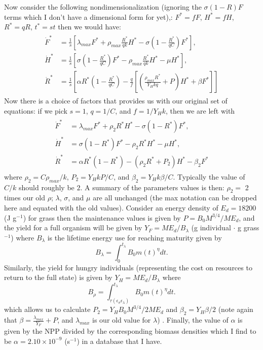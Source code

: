 \documentclass{pnastwo}
\begin{document}
\begin{article}
Now consider the following nondimensionalization (ignoring the $\sigma (1-R)F$ terms which I don't have a dimensional form for yet),: $F^{*}=fF$, $H^{*}=fH$, $R^{*}=qR$, $t^{*}=st$ then we would have:
\begin{align} 
\begin{split}
\dot{F}^{*} &= \frac{1}{s}\left[\lambda_{max} F^{*} + \rho_{max}\frac{R^{*}}{qk}H^{*} - \sigma \left(1-\frac{R^{*}}{qC}\right)F^{*}\right],  \\
\dot{H}^{*} &= \frac{1}{s}\left[\sigma \left(1-\frac{R^{*}}{qC}\right)F^{*} - \rho_{max}\frac{R^{*}}{qk} H^{*} - \mu H^{*}\right],  \\
\dot{R}^{*} &= \frac{1}{s}\left[\alpha R^{*}\left(1-\frac{R^{*}}{qC}\right) -\frac{q}{f}\left[\left(\frac{\rho_{max}R^{*}}{Y_{H}kq}+P\right)H^{*}+\beta F^{*}\right]\right]
\end{split}
\end{align}
Now there is a choice of factors that provides us with our original set of equations: if we pick $s=1$, $q=1/C$, and $f=1/Y_{H}k$, then we are left with 
\begin{align} 
\begin{split}
\dot{F}^{*} &= \lambda_{max} F^{*} + \rho_{2}R^{*}H^{*} - \sigma \left(1-R^{*}\right)F^{*},  \\
\dot{H}^{*} &= \sigma \left(1-R^{*}\right)F^{*} - \rho_{2} R^{*}H^{*} - \mu H^{*},  \\
\dot{R}^{*} &= \alpha R^{*}\left(1-R^{*}\right) -\left(\rho_{2}R^{*}+P_{2}\right)H^{*}-\beta_{2} F^{*}
\end{split}
\end{align}
where $\rho_{2}=C\rho_{max}/k$, $P_{2}=Y_{H}kP/C$, and $\beta_{2}=Y_{H}k\beta/C$. Typically the value of $C/k$ should roughly be $2$. A summary of the parameters values is then: $\rho_{2}=$ 2 times our old $\rho$; $\lambda$, $\sigma$, and $\mu$ are all unchanged (the max notation can be dropped here and equated with the old values). Consider an energy density of $E_{d}=18200$ (J g$^{-1}$) for grass \cite{estermann} then the maintenance values is given by $P=B_{0}M^{3/4}/ME_{d}$, and the yield for a full organism will be given by $Y_{F}=ME_{d}/B_{\lambda}$ (g individual $\cdot$ g grass $^{-1}$) where $B_{\lambda}$ is the lifetime energy use for reaching maturity given by 
\begin{equation}
B_{\lambda}=\int_{0}^{t_{\lambda}}B_{0}m\left(t\right)^{\eta}dt.
\end{equation}
Similarly, the yield for hungry individuals (representing the cost on resources to return to the full state) is given by $Y_{H}=ME_{d}/B_{\lambda}$ where
\begin{equation}
B_{\rho}=\int_{\tau\left(\epsilon_{\sigma}\epsilon_{\lambda}\right)}^{t_{\lambda}}B_{0}m\left(t\right)^{\eta}dt.
\end{equation}
which allows us to calculate $P_{2}=Y_{H}B_{0}M^{3/4}/2ME_{d}$ and $\beta_{2}=Y_{H}\beta/2$ (note again that $\beta=\frac{\lambda_{max}}{Y_{F}}+P$, and $\lambda_{max}$ is our old value for $\lambda$) . Finally, the value of $\alpha$ is given by the NPP divided by the corresponding biomass densities which I find to be $\alpha=2.10\times10^{-9}$ (s$^{-1}$) in a database that I have.


\end{article}
\end{document}
